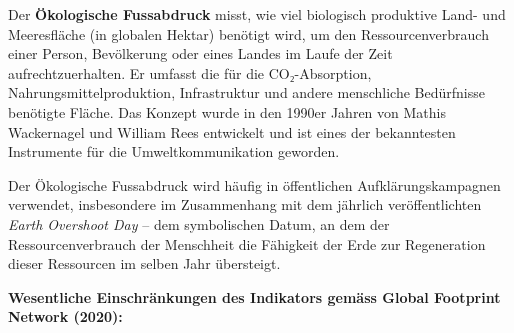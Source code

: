 \documentclass[
  nswissgerman,
  a4paper,
  DIV=11,
  numbers=noendperiod,
  oneside,
  openany]{scrreprt}
\begin{document}
\begin{tcolorbox}[enhanced jigsaw, arc=.35mm, bottomrule=.15mm, bottomtitle=1mm, breakable, colback=white, colbacktitle=quarto-callout-tip-color!10!white, colframe=quarto-callout-tip-color-frame, coltitle=black, left=2mm, leftrule=.75mm, opacityback=0, opacitybacktitle=0.6, rightrule=.15mm, title={Der Ökologische Fussabdruck -- Erklärung und Kritik}, titlerule=0mm, toprule=.15mm, toptitle=1mm]

Der \textbf{Ökologische Fussabdruck} misst, wie viel biologisch
produktive Land- und Meeresfläche (in globalen Hektar) benötigt wird, um
den Ressourcenverbrauch einer Person, Bevölkerung oder eines Landes im
Laufe der Zeit aufrechtzuerhalten. Er umfasst die für die
CO₂-Absorption, Nahrungsmittelproduktion, Infrastruktur und andere
menschliche Bedürfnisse benötigte Fläche. Das Konzept wurde in den
1990er Jahren von Mathis Wackernagel und William Rees entwickelt und ist
eines der bekanntesten Instrumente für die Umweltkommunikation geworden.

Der Ökologische Fussabdruck wird häufig in öffentlichen
Aufklärungskampagnen verwendet, insbesondere im Zusammenhang mit dem
jährlich veröffentlichten \emph{Earth Overshoot Day} -- dem symbolischen
Datum, an dem der Ressourcenverbrauch der Menschheit die Fähigkeit der
Erde zur Regeneration dieser Ressourcen im selben Jahr übersteigt.

\textbf{Wesentliche Einschränkungen des Indikators gemäss Global
Footprint Network (2020):}


\end{tcolorbox}
\end{document}
